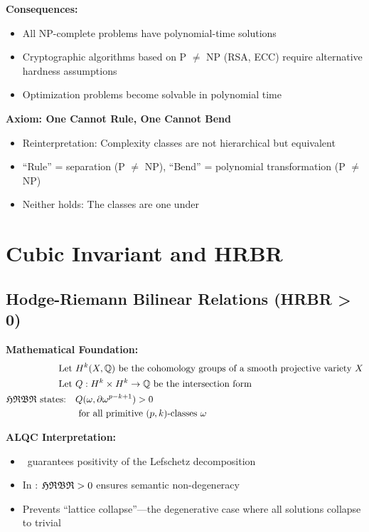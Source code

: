 \textbf{Consequences:}
\begin{itemize}
    \item All NP-complete problems have polynomial-time solutions
    \item Cryptographic algorithms based on P $\neq$ NP (RSA, ECC) require alternative hardness assumptions
    \item Optimization problems become solvable in polynomial time
\end{itemize}

\textbf{Axiom: One Cannot Rule, One Cannot Bend}
\begin{itemize}
    \item Reinterpretation: Complexity classes are not hierarchical but equivalent
    \item ``Rule'' = separation (P $\neq$ NP), ``Bend'' = polynomial transformation (P $\neq$ NP)
    \item Neither holds: The classes are one under \TSP
\end{itemize}

\section{Cubic Invariant and HRBR}

\subsection{Hodge-Riemann Bilinear Relations (HRBR > 0)}

\textbf{Mathematical Foundation:}
\begin{equation}
    \begin{aligned}
        \text{Let } & H^k(X, \mathbb{Q}) \text{ be the cohomology groups of a smooth projective variety } X \\
        \text{Let } & Q: H^k \times H^k \to \mathbb{Q} \text{ be the intersection form} \\
        \mathfrak{HRBR} \text{ states:} \quad & Q(\omega, \partial\omega^{p-k+1}) > 0 \\
        & \text{ for all primitive } (p,k)\text{-classes } \omega
    \end{aligned}
\end{equation}

\textbf{ALQC Interpretation:}
\begin{itemize}
    \item \HRBR\ guarantees positivity of the Lefschetz decomposition
    \item In \ALQC: $\mathfrak{HRBR} > 0$ ensures semantic non-degeneracy
    \item Prevents ``lattice collapse''—the degenerative case where all solutions collapse to trivial
\end{itemize}

